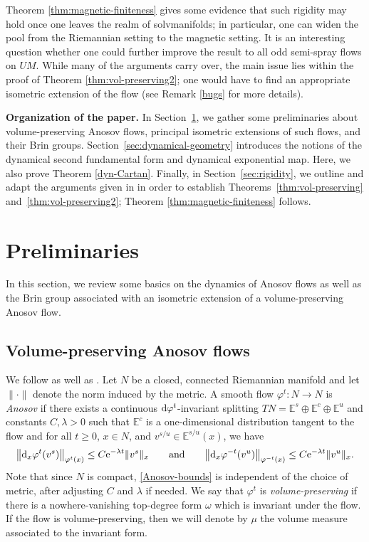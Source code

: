 \documentclass[pdftex]{sigma}
\newcommand{\E}{\mathbb{E}}
\numberwithin{equation}{section}
\theoremstyle{definition}
\begin{document}
Theorem \ref{thm:magnetic-finiteness} gives some evidence that such rigidity may hold once one leaves the realm of solvmanifolds; in particular, one can widen the pool from the Riemannian setting to the magnetic setting. It is an interesting question whether one could further improve the result to all odd semi-spray flows on $UM$. While many of the arguments carry over, the main issue lies within the proof of Theorem \ref{thm:vol-preserving2}; one would have to find an appropriate isometric extension of the flow (see Remark \ref{bugs} for more details).

{\bf Organization of the paper.} In Section~\ref{sec:preliminaries}, we gather some preliminaries about volume-preserving Anosov flows, principal isometric extensions of such flows, and their Brin groups. Section~\ref{sec:dynamical-geometry} introduces the notions of the dynamical second fundamental form and dynamical exponential map. Here, we also prove Theorem \ref{dyn-Cartan}. Finally, in Section~\ref{sec:rigidity}, we outline and adapt the arguments given in \cite{filip2024finiteness} in order to establish Theorems~\ref{thm:vol-preserving} and~\ref{thm:vol-preserving2}; Theorem \ref{thm:magnetic-finiteness} follows.


\section{Preliminaries}\label{sec:preliminaries}

In this section, we review some basics on the dynamics of Anosov flows as well as the Brin group associated with an isometric extension of a volume-preserving Anosov flow.

\subsection{Volume-preserving Anosov flows} \label{subsec:anosov-flows}

We follow \cite[Section 2.1]{filip2024finiteness} as well as \cite{fisher}. Let $N$ be a closed, connected Riemannian manifold and let $\|\cdot\|$ denote the norm induced by the metric. A smooth flow $\varphi^t \colon N \rightarrow N$ is \emph{Anosov} if there exists a continuous \mbox{${\rm d}\varphi^t$-in\-va\-ri\-ant} splitting $TN = \E^s \oplus \E^c \oplus \E^u$ and constants $C, \lambda > 0$ such that $\E^c$ is a one-dimensional distribution tangent to the flow and for all $t \geq 0$, $x \in N$, and $v^{s/u} \in \E^{s/u}(x)$, we have
\begin{equation}\label{Anosov-bounds} \bigl\|{\rm d}_x \varphi^t(v^s)\bigr\|_{\varphi^t(x)} \leq C {\rm e}^{-\lambda t} \|v^s\|_x \qquad \text{and}\qquad \bigl\|{\rm d}_x\varphi^{-t}(v^u)\bigr\|_{\varphi^{-t}(x)} \leq C {\rm e}^{-\lambda t} \|v^u\|_x. \end{equation}
Note that since $N$ is compact,
\eqref{Anosov-bounds}
is independent of the choice of metric, after adjusting $C$ and $\lambda$ if needed.
We say that $\varphi^t$ is \emph{volume-preserving} if there is a nowhere-vanishing top-degree form $\omega$ which is invariant under the flow. If the flow is volume-preserving, then we will denote by $\mu$ the volume measure associated to the invariant form.
\end{document}
